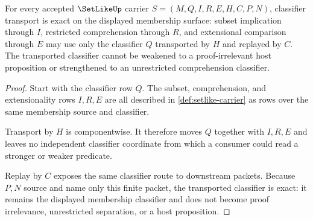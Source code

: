 \begin{theorem}
\label{thm:setlike-classifier-transport-exactness}
For every accepted $\SetLikeUp$ carrier $S=(M,Q,I,R,E,H,C,P,N)$, classifier transport is exact on the displayed membership surface: subset implication through $I$, restricted comprehension through $R$, and extensional comparison through $E$ may use only the classifier $Q$ transported by $H$ and replayed by $C$. The transported classifier cannot be weakened to a proof-irrelevant host proposition or strengthened to an unrestricted comprehension classifier.
\end{theorem}
\begin{proof}
Start with the classifier row $Q$. The subset, comprehension, and extensionality rows $I,R,E$ are all described in \autoref{def:setlike-carrier} as rows over the same membership source and classifier.

Transport by $H$ is componentwise. It therefore moves $Q$ together with $I,R,E$ and leaves no independent classifier coordinate from which a consumer could read a stronger or weaker predicate.

Replay by $C$ exposes the same classifier route to downstream packets. Because $P,N$ source and name only this finite packet, the transported classifier is exact: it remains the displayed membership classifier and does not become proof irrelevance, unrestricted separation, or a host proposition.
\end{proof}

